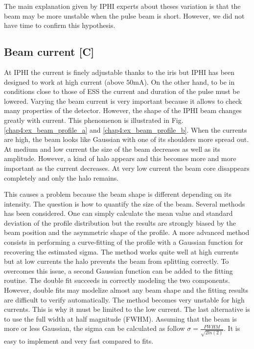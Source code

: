 \begin{refsection}
  

  The main explanation given by IPHI experts about theses variation is that the beam may be more unstable when the pulse beam is short. However, we did not have time to confirm this hypothesis.

  \subsection{Beam current [C]}
  At IPHI the current is finely adjustable thanks to the iris but  IPHI has been designed to work at high current (above $50\mathrm{mA}$). On the other hand, to be in conditions close to those of ESS the current and duration of the pulse must be lowered. Varying the beam current is very important because it allows to check many properties of the detector. However, the shape of the IPHI beam changes greatly with current. This phenomenon is illustrated in Fig. \ref{chap4:ex_beam_profile_a} and \ref{chap4:ex_beam_profile_b}. When the currents are high, the beam looks like Gaussian with one of its shoulders more spread out. At medium and low current the size of the beam decreases as well as its amplitude. However, a kind of halo appears and this becomes more and more important as the current decreases. At very low current the beam core disappears completely and only the halo remains.

  

  This causes a problem because the beam shape is different depending on its intensity. The question is how to quantify the size of the beam. Several methods has been considered. One can simply calculate the mean value and standard deviation of the profile distribution but the results are strongly biased by the beam position and the asymmetric shape of the profile. A more advanced method consists in performing a curve-fitting of the profile with a Gaussian function for recovering the estimated sigma. The method works quite well at high currents but at low currents the halo prevents the beam from splitting correctly. To overcomes this issue, a second Gaussian function can be added to the fitting routine. The double fit succeeds in correctly modeling the two components. However, double fits may modelize almost any beam shape and the fitting results are difficult to verify automatically. The method becomes very unstable for high currents. This is why it must be limited to the low current. The last alternative is to use the full width at half magnitude (FWHM). Assuming that the beam is more or less Gaussian, the sigma can be calculated as follow $\sigma = \frac{FWHM}{\sqrt{2ln(2)}}$. It is easy to implement and very fast compared to fits.


\end{refsection}
